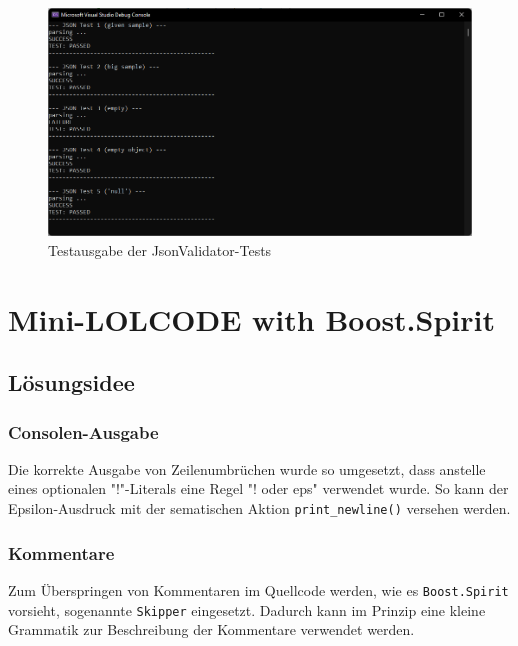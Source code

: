 \documentclass[german,notitlepage,smartquotes]{hgbreport}
\begin{document}
\begin{figure}[h]
\centering
\includegraphics[width=.95\textwidth]{json_test}
\caption{Testausgabe der JsonValidator-Tests}
\label{fig:json_test}
\end{figure}

\clearpage


\section{Mini-LOLCODE with Boost.Spirit}

\subsection{Lösungsidee}

\subsubsection{Consolen-Ausgabe}

Die korrekte Ausgabe von Zeilenumbrüchen wurde so umgesetzt, dass anstelle eines optionalen "!"-Literals eine Regel "! oder eps" verwendet wurde. So kann der Epsilon-Ausdruck mit der sematischen Aktion \texttt{print\_newline()} versehen werden.

\subsubsection{Kommentare}

Zum Überspringen von Kommentaren im Quellcode werden, wie es \texttt{Boost.Spirit} vorsieht, sogenannte \texttt{Skipper} eingesetzt. Dadurch kann im Prinzip eine kleine Grammatik zur Beschreibung der Kommentare verwendet werden.
\end{document}
